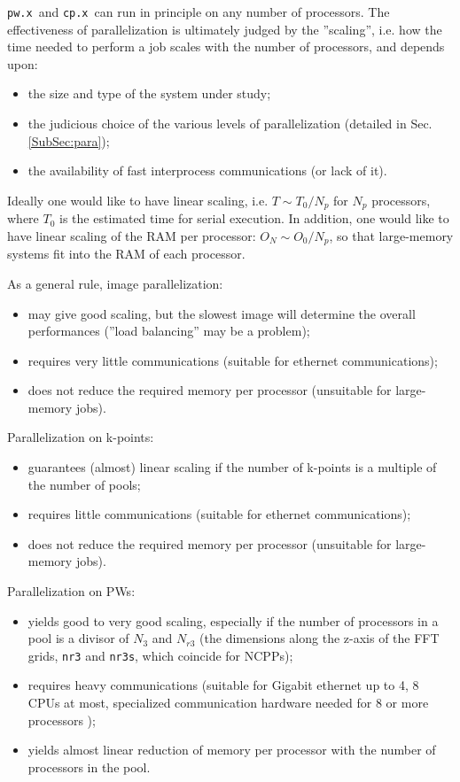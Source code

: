 \documentclass[12pt,a4paper]{article}
\def\pw.x{\texttt{pw.x}}
\def\cp.x{\texttt{cp.x}}
\begin{document}
\pw.x\ and \cp.x\ can run in principle on any number of processors.
The effectiveness of parallelization is ultimately judged by the 
''scaling'', i.e. how the time needed to perform a job scales
 with the number of processors, and depends upon:
\begin{itemize}
\item the size and type of the system under study;
\item the judicious choice of the various levels of parallelization 
(detailed in Sec.\ref{SubSec:para});
\item the availability of fast interprocess communications (or lack of it).
\end{itemize}
Ideally one would like to have linear scaling, i.e. $T \sim T_0/N_p$ for 
$N_p$ processors, where $T_0$ is the estimated time for serial execution.
 In addition, one would like to have linear scaling of
the RAM per processor: $O_N \sim O_0/N_p$, so that large-memory systems
fit into the RAM of each processor.

As a general rule, image parallelization:
\begin{itemize}
\item  may give good scaling, but the slowest image will determine
the overall performances (''load balancing'' may be a problem);
\item requires very little communications (suitable for ethernet 
communications);
\item does not reduce the required memory per processor (unsuitable for 
large-memory jobs).
\end{itemize}
Parallelization on k-points:
\begin{itemize}
\item guarantees (almost) linear scaling if the number of k-points
is a multiple of the number of pools;
\item requires little communications (suitable for ethernet communications);
\item does not reduce the required memory per processor (unsuitable for 
large-memory jobs).
\end{itemize}
Parallelization on PWs:
\begin{itemize}
\item yields good to very good scaling, especially if the number of processors
in a pool is a divisor of $N_3$ and $N_{r3}$ (the dimensions along the z-axis 
of the FFT grids, \texttt{nr3} and \texttt{nr3s}, which coincide for NCPPs);
\item requires heavy communications (suitable for Gigabit ethernet up to 
4, 8 CPUs at most, specialized communication hardware needed for 8 or more
processors );
\item yields almost linear reduction of memory per processor with the number
of processors in the pool.
\end{itemize}
\end{document}
